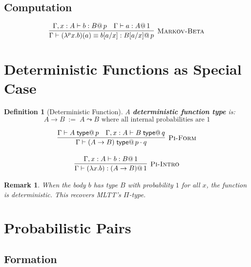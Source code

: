 \documentclass[11pt,a4paper]{article}
\makeatletter
\newtheorem{definition}{Definition}[section]
\newtheorem{remark}{Remark}[section]
\newcommand{\type}{\;\mathsf{type}}
\newcommand{\pmark}[1]{@\, #1}  %
\makeatother
\begin{document}
\subsection{Computation}

\begin{gather}
\infer[\textsc{Markov-Beta}]
  {\Gamma \vdash (\lambda^p x. b)(a) \equiv b[a/x] : B[a/x] \pmark{p}}
  {\Gamma, x : A \vdash b : B \pmark{p} & \Gamma \vdash a : A \pmark{1}}
\end{gather}

\section{Deterministic Functions as Special Case}

\begin{definition}[Deterministic Function]
A \textbf{deterministic function type} is:
\[
A \to B \;:=\; A \leadsto B \text{ where all internal probabilities are } 1
\]
\end{definition}

\begin{gather}
\infer[\textsc{Pi-Form}]
  {\Gamma \vdash (A \to B) \type \pmark{p \cdot q}}
  {\Gamma \vdash A \type \pmark{p} & \Gamma, x : A \vdash B \type \pmark{q}}
\\[1em]
\infer[\textsc{Pi-Intro}]
  {\Gamma \vdash (\lambda x. b) : (A \to B) \pmark{1}}
  {\Gamma, x : A \vdash b : B \pmark{1}}
\end{gather}

\begin{remark}
When the body $b$ has type $B$ with probability $1$ for all $x$, the function is deterministic. This recovers MLTT's $\Pi$-type.
\end{remark}

\section{Probabilistic Pairs}

\subsection{Formation}
\end{document}
